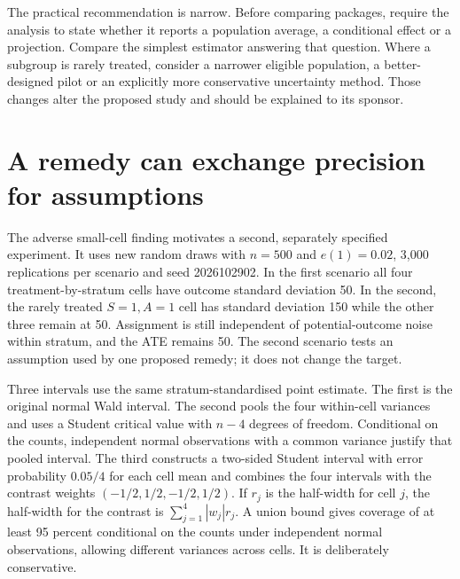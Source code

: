 The practical recommendation is narrow. Before comparing packages, require
the analysis to state whether it reports a population average, a conditional
effect or a projection. Compare the simplest estimator answering that question.
Where a subgroup is rarely treated, consider a narrower eligible population,
a better-designed pilot or an explicitly more conservative uncertainty method.
Those changes alter the proposed study and should be explained to its sponsor.

\section{A remedy can exchange precision for assumptions}
The adverse small-cell finding motivates a second, separately specified
experiment. It uses new random draws with $n=500$ and $e(1)=0.02$, 3,000
replications per scenario and seed 2026102902. In the first scenario all four
treatment-by-stratum cells have outcome standard deviation 50. In the second,
the rarely treated $S=1,A=1$ cell has standard deviation 150 while the other
three remain at 50. Assignment is still independent of potential-outcome noise
within stratum, and the ATE remains 50. The second scenario tests an assumption
used by one proposed remedy; it does not change the target.

Three intervals use the same stratum-standardised point estimate. The first is
the original normal Wald interval. The second pools the four within-cell
variances and uses a Student critical value with $n-4$ degrees of freedom.
Conditional on the counts, independent normal observations with a common
variance justify that pooled interval. The third constructs a two-sided Student
interval with error probability $0.05/4$ for each cell mean and combines the
four intervals with the contrast weights $(-1/2,1/2,-1/2,1/2)$. If $r_j$ is
the half-width for cell $j$, the half-width for the contrast is
$\sum_{j=1}^4 |w_j|r_j$. A union bound gives coverage of at least 95 percent
conditional on the counts under independent normal observations, allowing
different variances across cells. It is deliberately conservative.


